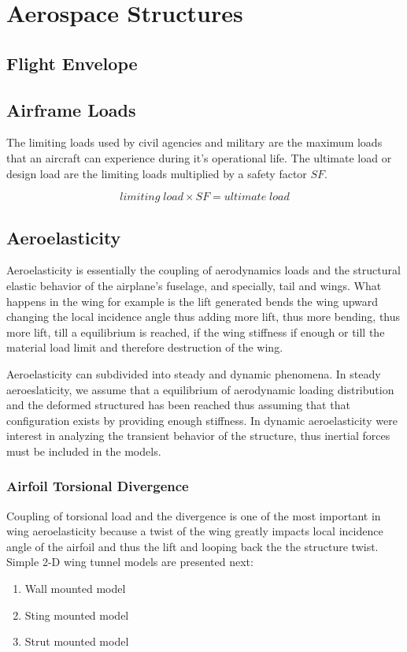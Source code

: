  \chapter{Aerospace Structures}


 \section{Flight Envelope}



 \section{Airframe Loads}
 The limiting loads used by civil agencies and military are the maximum loads that an aircraft can experience during it's operational life.
 The ultimate load or design load are the limiting loads multiplied by a safety factor $SF$.

 \begin{equation}
 limiting\; load \times SF = ultimate\; load
 \end{equation}
 \newpage
 \section{Aeroelasticity}
 Aeroelasticity is essentially the coupling of aerodynamics loads and the structural elastic behavior of the airplane's fuselage, and specially, tail and wings. What happens in the wing for example is the lift generated bends the wing upward changing the local incidence angle thus adding more lift, thus more bending, thus more lift, till a equilibrium is reached, if the wing stiffness if enough or till the material load limit and therefore destruction of the wing.

 Aeroelasticity can subdivided into steady and dynamic phenomena. In steady aeroeslaticity, we assume that a equilibrium of aerodynamic loading distribution and the deformed structured has been reached thus assuming that that configuration exists by providing enough stiffness.  In dynamic aeroelasticity were interest in analyzing the transient behavior of the structure, thus inertial forces must be included in the models.

 \subsection{Airfoil Torsional Divergence}
 Coupling of torsional load and the divergence is one of the most important in wing aeroelasticity because a twist of the wing greatly impacts local incidence angle of the airfoil and thus the lift and looping back the the structure twist.
 Simple 2-D wing tunnel models are presented next:
 \begin{enumerate}
 \item Wall mounted model
 \item Sting mounted model
 \item Strut mounted model
 \end{enumerate}

